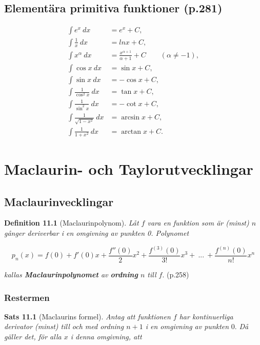 \documentclass[11pt]{article}
\begin{document}
\subsection{Elementära primitiva funktioner (p.281)}

\begin{align}
    \int e^{x}\ dx &= e^x + C,\\
    \int \frac{1}{x}\ dx &= ln x + C,\\
    \int x^{\alpha}\ dx &= \frac{x^{\alpha + 1}}{\alpha + 1} + C \qquad (\alpha \neq -1),\\
    \int \cos x\ dx &= \sin x + C,\\
    \int \sin x\ dx &= -\cos x + C,\\
    \int \frac{1}{\cos^2 x}\ dx &= \tan x + C,\\
    \int \frac{1}{\sin^2 x}\ dx &= -\cot x + C,\\
    \int \frac{1}{\sqrt{1 - x^2}}\ dx &= \arcsin x + C,\\
    \int \frac{1}{1 + x^2}\ dx &= \arctan x + C.
\end{align}

\newpage
\section{Maclaurin- och Taylorutvecklingar}

\subsection{Maclaurinvecklingar}

\textbf{Definition 11.1} (Maclaurinpolynom). \textit{Låt $f$ vara en funktion som är (minst) $n$ gånger deriverbar i en omgivning av punkten 0. Polynomet}

\begin{equation}
    p_n(x) = f(0) + f'(0)x + \frac{f''(0)}{2}x^2 + \frac{f^{(3)}(0)}{3!}x^3 +\ ...\ + \frac{f^{(n)}(0)}{n!}x^n
    \label{eq:maclaurinpolynom}
\end{equation}

\textit{kallas \textbf{Maclaurinpolynomet} av \textbf{ordning} $n$ till $f$}. (p.258)

\subsubsection{Restermen}

\textbf{Sats 11.1} (Maclaurins formel). \textit{Antag att funktionen $f$ har kontinuerliga derivator (minst) till och med ordning $n + 1$ i en omgivning av punkten} 0. \textit{Då gäller det, för alla $x$ i denna omgivning, att}
\end{document}
